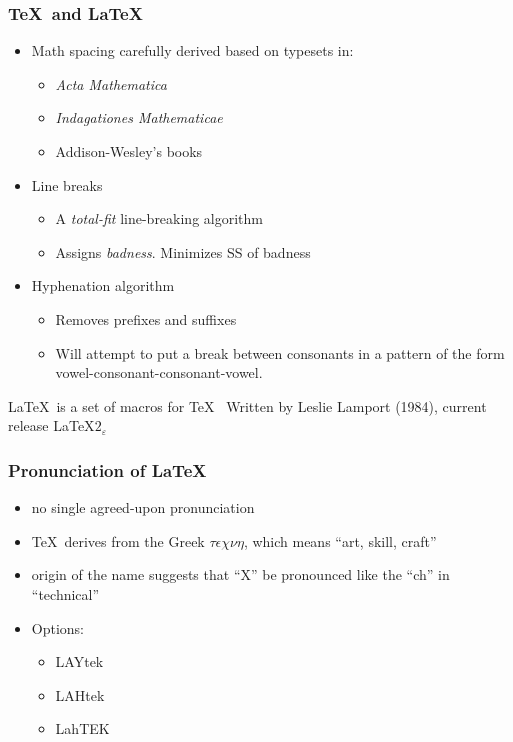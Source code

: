 \documentclass{beamer}
\begin{document}
\frame
{
\frametitle{\TeX\ and \LaTeX}
\begin{itemize}
\item<1-> Math spacing carefully derived based on typesets in:
\begin{itemize}
\item \emph{Acta Mathematica}
\item \emph{Indagationes Mathematicae}
\item Addison-Wesley's books
\end{itemize}
\item<2-> Line breaks
\begin{itemize}
\pause
\item A {\em total-fit} line-breaking algorithm
\item Assigns {\em badness}. Minimizes SS of badness
\end{itemize}
\pause
\item<3-> Hyphenation algorithm
\begin{itemize}
\item Removes prefixes and suffixes
\item Will attempt to put a break between consonants in a pattern of the form
vowel-consonant-consonant-vowel.
\end{itemize}
\end{itemize}
\pause

%
%
\begin{beamerboxesrounded}[upper=uppercol,lower=lowercol,shadow=true]
{\LaTeX\ is a set of macros for \TeX\ }
Written by Leslie Lamport (1984), current release \LaTeX$2_\varepsilon$
\end{beamerboxesrounded}

}


\frame
{
\frametitle{Pronunciation of \LaTeX}
\begin{itemize}
\item no single agreed-upon pronunciation
\item \TeX\ derives from the Greek $\tau\epsilon\chi\nu\eta$, which means ``art, skill, craft''
\item origin of the name suggests that ``X'' be pronounced like the ``ch'' in ``technical''
\item Options:
\begin{itemize}
\item LAYtek
\item LAHtek
\item LahTEK
\end{itemize}
\end{itemize}

}
\end{document}
